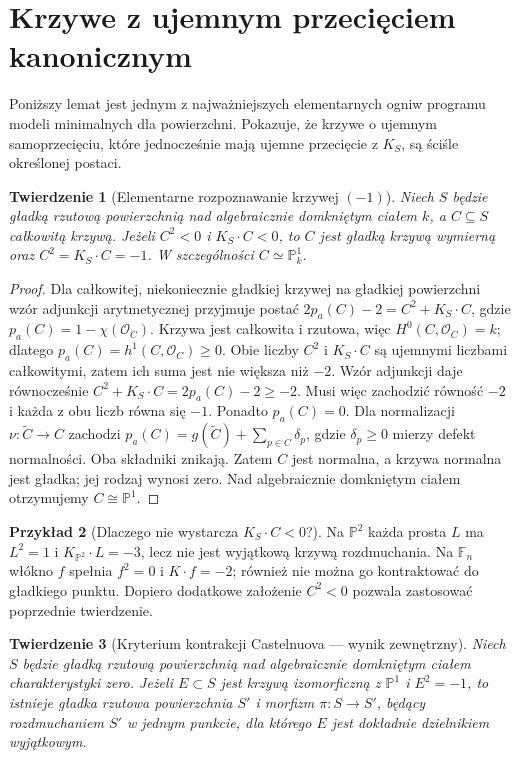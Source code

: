 \documentclass[11pt,a4paper,openany]{report}
\numberwithin{equation}{section}
\theoremstyle{plain}
\newtheorem{twierdzenie}{Twierdzenie}[section]
\theoremstyle{definition}
\newtheorem{przyklad}[twierdzenie]{Przykład}
\theoremstyle{remark}
\newcommand{\PP}{\mathbb P}
\begin{document}
\section{Krzywe z ujemnym przecięciem kanonicznym}
\label{sec:ga8-negative-curves}

Poniższy lemat jest jednym z najważniejszych elementarnych
ogniw programu modeli minimalnych dla powierzchni.
Pokazuje, że krzywe o ujemnym samoprzecięciu, które
jednocześnie mają ujemne przecięcie z $K_S$, są
ściśle określonej postaci.

\begin{twierdzenie}[Elementarne rozpoznawanie krzywej $(-1)$]
\label{tw:ga8-negative-implies-minusone}
Niech $S$ będzie gładką rzutową powierzchnią nad
algebraicznie domkniętym ciałem $k$, a $C\subseteq S$
całkowitą krzywą. Jeżeli $C^2<0$ i $K_S\cdot C<0$,
to $C$ jest gładką krzywą wymierną oraz
$C^2=K_S\cdot C=-1$. W szczególności
$C\simeq\PP^1_k$.
\end{twierdzenie}
\begin{proof}
Dla całkowitej, niekoniecznie gładkiej krzywej
na gładkiej powierzchni wzór adjunkcji arytmetycznej
przyjmuje postać
$2p_a(C)-2=C^2+K_S\cdot C$, gdzie
$p_a(C)=1-\chi(\mathcal O_C)$.
Krzywa jest całkowita i rzutowa, więc
$H^0(C,\mathcal O_C)=k$; dlatego
$p_a(C)=h^1(C,\mathcal O_C)\ge0$.
Obie liczby $C^2$ i $K_S\cdot C$ są ujemnymi
liczbami całkowitymi, zatem ich suma jest nie
większa niż $-2$. Wzór adjunkcji daje równocześnie
$C^2+K_S\cdot C=2p_a(C)-2\ge-2$.
Musi więc zachodzić równość $-2$ i każda z obu
liczb równa się $-1$. Ponadto $p_a(C)=0$.
Dla normalizacji $\nu:\widetilde C\to C$ zachodzi
$p_a(C)=g(\widetilde C)+\sum_{p\in C}\delta_p$,
gdzie $\delta_p\ge0$ mierzy defekt normalności.
Oba składniki znikają. Zatem $C$ jest normalna,
a krzywa normalna jest gładka; jej rodzaj wynosi zero.
Nad algebraicznie domkniętym ciałem otrzymujemy
$C\cong\PP^1$.
\end{proof}

\begin{przyklad}[Dlaczego nie wystarcza $K_S\cdot C<0$?]
Na $\PP^2$ każda prosta $L$ ma $L^2=1$ i
$K_{\PP^2}\cdot L=-3$, lecz nie jest wyjątkową
krzywą rozdmuchania. Na $\mathbb F_n$ włókno $f$
spełnia $f^2=0$ i $K\cdot f=-2$; również nie
można go kontraktować do gładkiego punktu.
Dopiero dodatkowe założenie $C^2<0$ pozwala
zastosować poprzednie twierdzenie.
\end{przyklad}

\begin{twierdzenie}[Kryterium kontrakcji Castelnuova — wynik zewnętrzny]
\label{tw:ga8-castelnuovo-mmp}
Niech $S$ będzie gładką rzutową powierzchnią nad
algebraicznie domkniętym ciałem charakterystyki zero.
Jeżeli $E\subset S$ jest krzywą izomorficzną z $\PP^1$
i $E^2=-1$, to istnieje gładka rzutowa powierzchnia
$S'$ i morfizm $\pi:S\to S'$, będący rozdmuchaniem
$S'$ w jednym punkcie, dla którego $E$ jest dokładnie
dzielnikiem wyjątkowym.
\end{twierdzenie}
\end{document}

